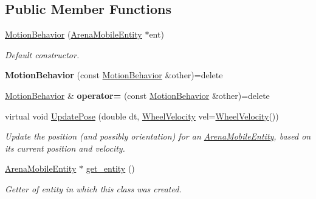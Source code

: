 \subsection*{Public Member Functions}
\begin{DoxyCompactItemize}
\item 
\hyperlink{classMotionBehavior_aa2d5f7d563f4fdb5702edb8367eaa6e7}{Motion\+Behavior} (\hyperlink{classArenaMobileEntity}{Arena\+Mobile\+Entity} $\ast$ent)\hypertarget{classMotionBehavior_aa2d5f7d563f4fdb5702edb8367eaa6e7}{}\label{classMotionBehavior_aa2d5f7d563f4fdb5702edb8367eaa6e7}

\begin{DoxyCompactList}\small\item\em Default constructor. \end{DoxyCompactList}\item 
{\bfseries Motion\+Behavior} (const \hyperlink{classMotionBehavior}{Motion\+Behavior} \&other)=delete\hypertarget{classMotionBehavior_a7471f273b1a6574cd3ab66619d26cda7}{}\label{classMotionBehavior_a7471f273b1a6574cd3ab66619d26cda7}

\item 
\hyperlink{classMotionBehavior}{Motion\+Behavior} \& {\bfseries operator=} (const \hyperlink{classMotionBehavior}{Motion\+Behavior} \&other)=delete\hypertarget{classMotionBehavior_a3e6f7e2ff1c7d27c7e288152a50d2e6d}{}\label{classMotionBehavior_a3e6f7e2ff1c7d27c7e288152a50d2e6d}

\item 
virtual void \hyperlink{classMotionBehavior_a804f440bb7f03f19abec79a1ab671494}{Update\+Pose} (double dt, \hyperlink{structWheelVelocity}{Wheel\+Velocity} vel=\hyperlink{structWheelVelocity}{Wheel\+Velocity}())
\begin{DoxyCompactList}\small\item\em Update the position (and possibly orientation) for an \hyperlink{classArenaMobileEntity}{Arena\+Mobile\+Entity}, based on its current position and velocity. \end{DoxyCompactList}\item 
\hyperlink{classArenaMobileEntity}{Arena\+Mobile\+Entity} $\ast$ \hyperlink{classMotionBehavior_a1daf82b16d312ba6f5f71178e7fafa79}{get\+\_\+entity} ()\hypertarget{classMotionBehavior_a1daf82b16d312ba6f5f71178e7fafa79}{}\label{classMotionBehavior_a1daf82b16d312ba6f5f71178e7fafa79}

\begin{DoxyCompactList}\small\item\em Getter of entity in which this class was created. \end{DoxyCompactList}\end{DoxyCompactItemize}
